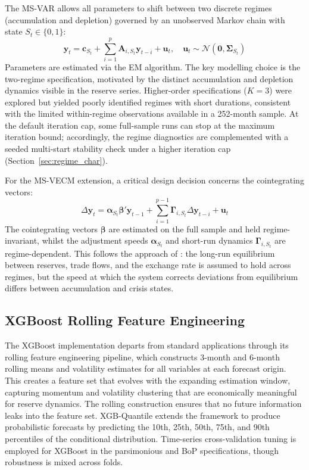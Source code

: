 \documentclass[12pt,a4paper]{article}
\begin{document}
The MS-VAR allows all parameters to shift between two discrete regimes (accumulation and depletion) governed by an unobserved Markov chain with state $S_t \in \{0, 1\}$:
\[
\mathbf{y}_t = \mathbf{c}_{S_t} + \sum_{i=1}^{p} \mathbf{A}_{i,S_t} \mathbf{y}_{t-i} + \mathbf{u}_t, \quad \mathbf{u}_t \sim \mathcal{N}(\mathbf{0}, \boldsymbol{\Sigma}_{S_t})
\]
Parameters are estimated via the EM algorithm. The key modelling choice is the two-regime specification, motivated by the distinct accumulation and depletion dynamics visible in the reserve series. Higher-order specifications ($K = 3$) were explored but yielded poorly identified regimes with short durations, consistent with the limited within-regime observations available in a 252-month sample. At the default iteration cap, some full-sample runs can stop at the maximum iteration bound; accordingly, the regime diagnostics are complemented with a seeded multi-start stability check under a higher iteration cap (Section~\ref{sec:regime_char}).

For the MS-VECM extension, a critical design decision concerns the cointegrating vectors:
\[
\Delta \mathbf{y}_t = \boldsymbol{\alpha}_{S_t} \boldsymbol{\beta}' \mathbf{y}_{t-1} + \sum_{i=1}^{p-1} \boldsymbol{\Gamma}_{i,S_t} \Delta \mathbf{y}_{t-i} + \mathbf{u}_t
\]
The cointegrating vectors $\boldsymbol{\beta}$ are estimated on the full sample and held regime-invariant, whilst the adjustment speeds $\boldsymbol{\alpha}_{S_t}$ and short-run dynamics $\boldsymbol{\Gamma}_{i,S_t}$ are regime-dependent. This follows the approach of \cite{Krolzig1997}: the long-run equilibrium between reserves, trade flows, and the exchange rate is assumed to hold across regimes, but the speed at which the system corrects deviations from equilibrium differs between accumulation and crisis states.

\subsection{XGBoost Rolling Feature Engineering}

The XGBoost implementation departs from standard applications through its rolling feature engineering pipeline, which constructs 3-month and 6-month rolling means and volatility estimates for all variables at each forecast origin. This creates a feature set that evolves with the expanding estimation window, capturing momentum and volatility clustering that are economically meaningful for reserve dynamics. The rolling construction ensures that no future information leaks into the feature set. XGB-Quantile extends the framework to produce probabilistic forecasts by predicting the 10th, 25th, 50th, 75th, and 90th percentiles of the conditional distribution. Time-series cross-validation tuning is employed for XGBoost in the parsimonious and BoP specifications, though robustness is mixed across folds.
\end{document}
